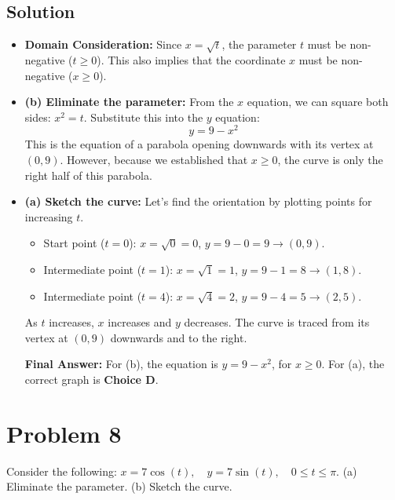 \documentclass{article}
\begin{document}
\subsection*{Solution}
\begin{itemize}
    \item \textbf{Domain Consideration:} Since $x = \sqrt{t}$, the parameter $t$ must be non-negative ($t \ge 0$). This also implies that the coordinate $x$ must be non-negative ($x \ge 0$).

    \item \textbf{(b) Eliminate the parameter:}
    From the $x$ equation, we can square both sides: $x^2 = t$.
    Substitute this into the $y$ equation:
    \[ y = 9 - x^2 \]
    This is the equation of a parabola opening downwards with its vertex at $(0, 9)$. However, because we established that $x \ge 0$, the curve is only the right half of this parabola.

    \item \textbf{(a) Sketch the curve:}
    Let's find the orientation by plotting points for increasing $t$.
    \begin{itemize}
        \item Start point ($t=0$): $x = \sqrt{0} = 0$, $y = 9 - 0 = 9 \rightarrow (0, 9)$.
        \item Intermediate point ($t=1$): $x = \sqrt{1} = 1$, $y = 9 - 1 = 8 \rightarrow (1, 8)$.
        \item Intermediate point ($t=4$): $x = \sqrt{4} = 2$, $y = 9 - 4 = 5 \rightarrow (2, 5)$.
    \end{itemize}
    As $t$ increases, $x$ increases and $y$ decreases. The curve is traced from its vertex at $(0, 9)$ downwards and to the right.

    \textbf{Final Answer:} For (b), the equation is $y = 9 - x^2$, for $x \ge 0$. For (a), the correct graph is \textbf{Choice D}.
\end{itemize}

\section{Problem 8}
Consider the following: $x = 7 \cos(t), \quad y = 7 \sin(t), \quad 0 \le t \le \pi$.
(a) Eliminate the parameter.
(b) Sketch the curve.
\end{document}
